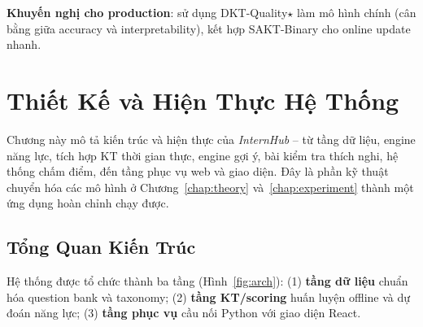 \documentclass[12pt, a4paper]{report}
\newcommand{\system}{\textit{InternHub}}
\begin{document}
\textbf{Khuyến nghị cho production}: sử dụng DKT-Quality$\star$ làm mô hình chính (cân bằng giữa accuracy và interpretability), kết hợp SAKT-Binary cho online update nhanh.

\chapter{Thiết Kế và Hiện Thực Hệ Thống}
\label{chap:system}

Chương này mô tả kiến trúc và hiện thực của \system{} -- từ tầng dữ liệu, engine năng lực, tích hợp KT thời gian thực, engine gợi ý, bài kiểm tra thích nghi, hệ thống chấm điểm, đến tầng phục vụ web và giao diện. Đây là phần kỹ thuật chuyển hóa các mô hình ở Chương~\ref{chap:theory} và~\ref{chap:experiment} thành một ứng dụng hoàn chỉnh chạy được.

\section{Tổng Quan Kiến Trúc}
\label{sec:arch}

Hệ thống được tổ chức thành ba tầng (Hình~\ref{fig:arch}): (1) \textbf{tầng dữ liệu} chuẩn hóa question bank và taxonomy; (2) \textbf{tầng KT/scoring} huấn luyện offline và dự đoán năng lực; (3) \textbf{tầng phục vụ} cầu nối Python với giao diện React.
\end{document}
